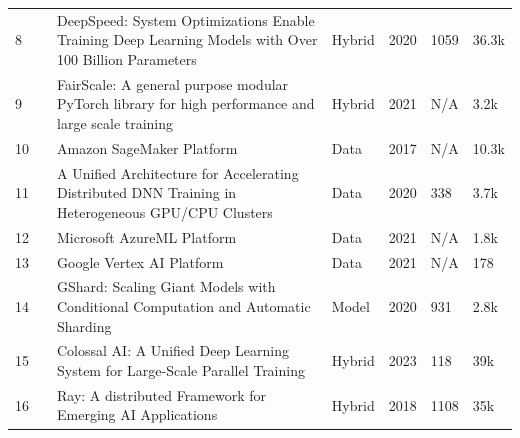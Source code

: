 \begin{table}[htbp]
\begin{tabular}{llp{8.01cm}p{2cm}lll}
		8           & \cite{rasley_deepspeed_2020}     & DeepSpeed: System Optimizations Enable Training Deep Learning Models with Over 100 Billion Parameters     & Hybrid         & 2020          & 1059               & 36.3k \cite{noauthor_microsoftdeepspeed_2025}                 \\[1ex]
		9           & \cite{noauthor_fairscale_nodate} & FairScale:  A general purpose modular PyTorch library for high performance and large scale training       & Hybrid         & 2021          & N/A                & 3.2k \cite{FairScale2021}                                     \\[1ex]
		10          & \cite{noauthor_amazon_nodate}    & Amazon SageMaker Platform                                                                                 & Data           & 2017          & N/A                & 10.3k \cite{noauthor_awsamazon-sagemaker-examples_2025}       \\[1ex]
		11          & \cite{jiang_unified_nodate}      & A Unified Architecture for Accelerating Distributed DNN Training in Heterogeneous GPU/CPU Clusters        & Data           & 2020          & 338                & 3.7k \cite{noauthor_bytedancebyteps_2025}                     \\[1ex]
		12          & \cite{sdgilley_azure_nodate}     & Microsoft AzureML Platform                                                                                & Data           & 2021          & N/A                & 1.8k \cite{noauthor_azureazureml-examples_2025}               \\[1ex]
		13          & \cite{noauthor_vertex_nodate}    & Google Vertex AI Platform                                                                                 & Data           & 2021          & N/A                & 178 \cite{noauthor_googlecloudplatformvertex-ai-samples_2025} \\[1ex]
		14          & \cite{lepikhin_gshard_2020}      & GShard: Scaling Giant Models with Conditional Computation and Automatic Sharding                          & Model          & 2020          & 931                & 2.8k \cite{noauthor_tensorflowlingvo_2025}                    \\[1ex]
		15          & \cite{li_colossal-ai_2023}       & Colossal AI: A Unified Deep Learning System for Large-Scale Parallel Training                             & Hybrid         & 2023          & 118                & 39k \cite{noauthor_hpcaitechcolossalai_2025}                  \\[1ex]
		16          & \cite{moritz_ray_2018}           & Ray: A distributed Framework for Emerging AI Applications                                                 & Hybrid         & 2018          & 1108               & 35k \cite{noauthor_ray-projectray_2025}                       \\[1ex]

\end{tabular}
\end{table}
